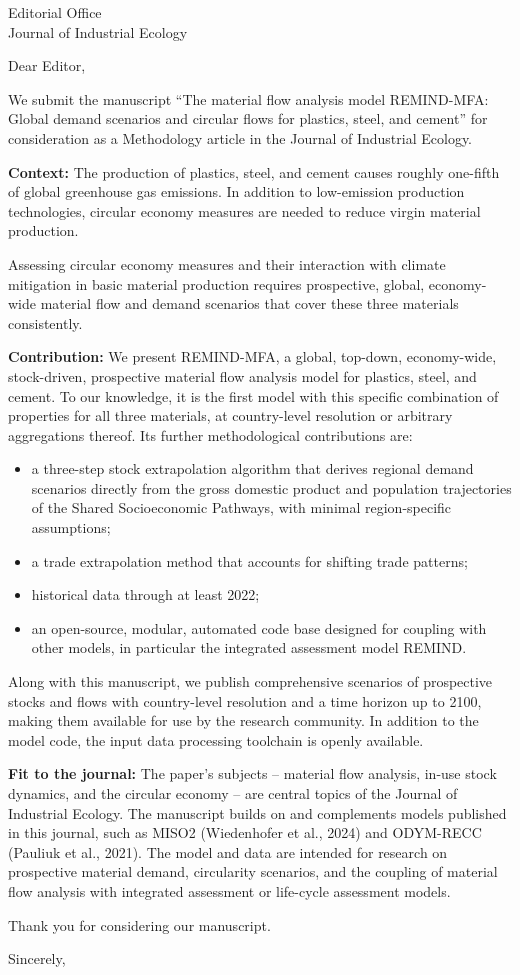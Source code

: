 \documentclass[10pt,a4paper]{letter}
\begin{document}
\begin{letter}{Editorial Office\\Journal of Industrial Ecology}

\opening{Dear Editor,}

We submit the manuscript ``The material flow analysis model REMIND-MFA: Global demand scenarios and circular flows for plastics, steel, and cement'' for consideration as a Methodology article in the Journal of Industrial Ecology.

\textbf{Context:} The production of plastics, steel, and cement causes roughly one-fifth of global greenhouse gas emissions.
In addition to low-emission production technologies, circular economy measures are needed to reduce virgin material production.

Assessing circular economy measures and their interaction with climate mitigation in basic material production requires prospective, global, economy-wide material flow and demand scenarios that cover these three materials consistently.

\textbf{Contribution:} We present REMIND-MFA, a global, top-down, economy-wide, stock-driven, prospective material flow analysis model for plastics, steel, and cement. To our knowledge, it is the first model with this specific combination of properties for all three materials, at country-level resolution or arbitrary aggregations thereof. Its further methodological contributions are:
\begin{itemize}
	\item a three-step stock extrapolation algorithm that derives regional demand scenarios directly from the gross domestic product and population trajectories of the Shared Socioeconomic Pathways, with minimal region-specific assumptions;
	\item a trade extrapolation method that accounts for shifting trade patterns;
	\item historical data through at least 2022;
	\item an open-source, modular, automated code base designed for coupling with other models, in particular the integrated assessment model REMIND.
\end{itemize}
Along with this manuscript, we publish comprehensive scenarios of prospective stocks and flows with country-level resolution and a time horizon up to 2100, making them available for use by the research community.
In addition to the model code, the input data processing toolchain is openly available.

\textbf{Fit to the journal:} The paper's subjects -- material flow analysis, in-use stock dynamics, and the circular economy -- are central topics of the Journal of Industrial Ecology. The manuscript builds on and complements models published in this journal, such as MISO2 (Wiedenhofer et al., 2024) and ODYM-RECC (Pauliuk et al., 2021). The model and data are intended for research on prospective material demand, circularity scenarios, and the coupling of material flow analysis with integrated assessment or life-cycle assessment models.

Thank you for considering our manuscript.

\closing{Sincerely,}

\end{letter}
\end{document}
